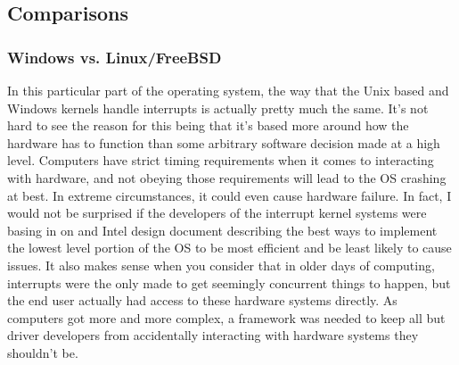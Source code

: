 \subsection{Comparisons}
\subsubsection{Windows vs. Linux/FreeBSD}
In this particular part of the operating system, the way that the Unix based and Windows kernels handle interrupts is actually pretty much the same. It's not hard to see the reason for this being that it's based more around how the hardware has to function than some arbitrary software decision made at a high level. Computers have strict timing requirements when it comes to interacting with hardware, and not obeying those requirements will lead to the OS crashing at best. In extreme circumstances, it could even cause hardware failure. In fact, I would not be surprised if the developers of the interrupt kernel systems were basing in on and Intel design document describing the best ways to implement the lowest level portion of the OS to be most efficient and be least likely to cause issues. It also makes sense when you consider that in older days of computing, interrupts were the only made to get seemingly concurrent things to happen, but the end user actually had access to these hardware systems directly. As computers got more and more complex, a framework was needed to keep all but driver developers from accidentally interacting with hardware systems they shouldn't be. 